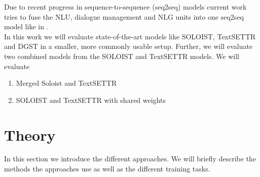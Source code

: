 \documentclass[twocolumn]{tum-article}
\begin{document}
Due to recent progress in sequence-to-sequence (seq2seq) models \cite{radford2019language, raffel2019exploring} current work tries to fuse the NLU, dialogue management and NLG units into one seq2seq model like in \cite{peng2020soloist}. \\
In this work we will evaluate state-of-the-art models like SOLOIST, TextSETTR and DGST in a smaller, more commonly usable setup. Further, we will evaluate two combined models from the SOLOIST and TextSETTR models. We will evaluate 
\begin{enumerate}
\item Merged Soloist and TextSETTR
\item SOLOIST and TextSETTR with shared weights
\end{enumerate}
\section{Theory}
In this section we introduce the different approaches. We will briefly describe the methods the approaches use as well as the different training tasks. 
\end{document}
